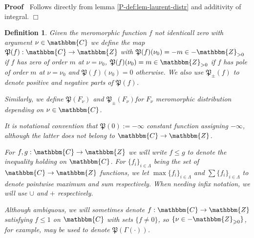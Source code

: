 \documentclass{article}
\newcommand{\assign}{:=}
\renewenvironment{proof}{\noindent\textbf{Proof\ }}{\hspace*{\fill}$\Box$\medskip}
\newtheorem{definition}[proposition]{Definition}
\theoremstyle{remark}
\begin{document}
\begin{proof}
  Follows directly from lemma \ref{P-def:lem-laurent-distr} and additivity of
  integral.
\end{proof}

\begin{definition}
  \label{def-P}Given the meromorphic function $f$ not identicall zero with
  argument $\nu \in \mathbbm{C}$ we define the map $\mathfrak{P} (f) :
  \mathbbm{C} \rightarrow \mathbbm{Z}$ with $\mathfrak{P} (f) (\nu_0) = - m
  \in -\mathbbm{Z}_{> 0}$ if $f$ has zero of order $m$ at $\nu = \nu_0$,
  $\mathfrak{P} (f) (\nu_0) = m \in \mathbbm{Z}_{> 0}$ if $f$ has pole of
  order $m$ at $\nu = \nu_0$ and $\mathfrak{P} (f) (\nu_0) = 0$ otherwise. We
  also use $\mathfrak{P}_{\pm} (f)$ to denote positive and negative parts of
  $\mathfrak{P} (f)$.
  
  Similarly, we define $\mathfrak{P} (F_{\nu})$ and $\mathfrak{P}_{\pm}
  (F_{\nu})$for $F_{\nu}$ meromorphic distribution depending on $\nu \in
  \mathbbm{C}$.
  
  It is notational convention that $\mathfrak{P} (0) \assign - \infty$
  constant function assigning $- \infty$, although the latter does not belong
  to $\mathbbm{C} \rightarrow \mathbbm{Z}$.
  
  For $f, g : \mathbbm{C} \rightarrow \mathbbm{Z}$ we will write $f \leqslant
  g$ to denote the inequality holding on $\mathbbm{C}$. For $\{ f_i \}_{i \in
  \Lambda}$ being the set of $\mathbbm{C} \rightarrow \mathbbm{Z}$ functions,
  we let $\max \{ f_i \}_{i \in \Lambda}$ and $\sum \{ f_i \}_{i \in \Lambda}$
  to denote pointwise maximum and sum respectively. When needing infix
  notation, we will use $\cup$ and $+$ respectively.
  
  Although ambiguous, we will sometimes denote $f : \mathbbm{C} \rightarrow
  \mathbbm{Z}$ satisfying $f \leqslant 1$ on $\mathbbm{C}$ with sets $\{ f
  \neq 0 \}$, so $\{ \nu \in -\mathbbm{Z}_{\geqslant 0} \}$, for example, may
  be used to denote $\mathfrak{P} (\Gamma (\cdot))$.
\end{definition}
\end{document}
